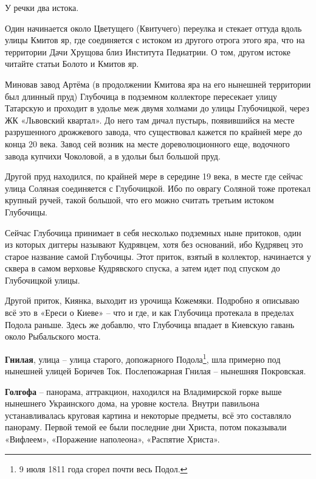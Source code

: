 У речки два истока. 

Один начинается около Цветущего (Квитучего) переулка и стекает оттуда вдоль улицы Кмитов яр, где соединяется с истоком из другого отрога этого яра, что на территории Дачи Хрущова близ Института Педиатрии. О том, другом истоке читайте статьи Болото и Кмитов яр.

Миновав завод Артёма (в продолжении Кмитова яра на его нынешней территории был длинный пруд) Глубочица в подземном коллекторе пересекает улицу Татарскую и проходит в удолье меж двумя холмами до улицы Глубочицкой, через ЖК «Львовский квартал». До него там дичал пустырь, появившийся на месте разрушенного дрожжевого завода, что существовал кажется по крайней мере до конца 20 века. Завод сей возник на месте дореволюционного еще, водочного завода купчихи Чоколовой, а в удольи был большой пруд.

Другой пруд находился, по крайней мере в середине 19 века, в месте где сейчас улица Соляная соединяется с Глубочицкой. Ибо по оврагу Соляной тоже протекал крупный ручей, такой большой, что его можно считать третьим истоком Глубочицы.

Сейчас Глубочица принимает в себя несколько подземных ныне притоков, один из которых диггеры называют Кудрявцем, хотя без оснований, ибо Кудрявец это старое название самой Глубочицы. Этот приток, взятый в коллектор, начинается у сквера в самом верховье Кудрявского спуска, а затем идет под спуском до Глубочицкой улицы.

Другой приток, Киянка, выходит из урочища Кожемяки. Подробно я описываю всё это в «Ереси о Киеве» – что и где, и как Глубочица протекала в пределах Подола раньше. Здесь же добавлю, что Глубочица впадает в Киевскую гавань около Рыбальского моста.\\

\medskip

\textbf{Гнилая}, улица – улица старого, допожарного Подола\footnote{9 июля 1811 года сгорел почти весь Подол.}, шла примерно под нынешней улицей Боричев Ток. Послепожарная Гнилая – нынешняя Покровская.\\

\medskip

\textbf{Голгофа} – панорама, аттракцион, находился на Владимирской горке выше нынешнего Украинского дома, на уровне костела. Внутри павильона устанавливалась круговая картина и некоторые предметы, всё это составляло панораму. Первой темой ее были последние дни Христа, потом показывали «Вифлеем», «Поражение наполеона», «Распятие Христа».

